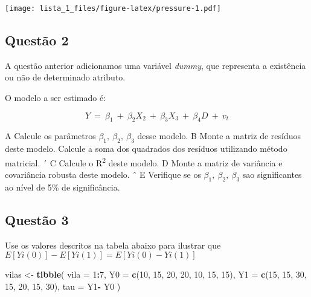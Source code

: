 \documentclass[
]{article}
\newenvironment{Shaded}{\begin{snugshade}}{\end{snugshade}}
\newcommand{\DataTypeTok}[1]{\textcolor[rgb]{0.13,0.29,0.53}{#1}}
\newcommand{\DecValTok}[1]{\textcolor[rgb]{0.00,0.00,0.81}{#1}}
\newcommand{\KeywordTok}[1]{\textcolor[rgb]{0.13,0.29,0.53}{\textbf{#1}}}
\newcommand{\NormalTok}[1]{#1}
\newcommand{\OperatorTok}[1]{\textcolor[rgb]{0.81,0.36,0.00}{\textbf{#1}}}
\newcommand{\StringTok}[1]{\textcolor[rgb]{0.31,0.60,0.02}{#1}}
\begin{document}
\texttt{[image: lista\_1\_files/figure-latex/pressure-1.pdf]}

\hypertarget{questuxe3o-2}{%
\subsection{Questão 2}\label{questuxe3o-2}}

A questão anterior adicionamos uma variável \emph{dummy}, que representa
a existência ou não de determinado atributo.

\begin{Shaded}
\end{Shaded}

O modelo a ser estimado é:

\[Y\ =\ \beta_1\ +\ \beta_2X_2\ +\ \beta_3X_3\ +\ \beta_4D\ +\ v_t\]

A Calcule os parâmetros \(\beta_{1},\ \beta_{2},\ \beta_{3}\) desse
modelo. B Monte a matriz de resíduos deste modelo. Calcule a soma dos
quadrados dos resíduos utilizando método matricial. ´ C Calcule o
R\textsuperscript{2} deste modelo. D Monte a matriz de variância e
covariância robusta deste modelo. ˆ E Verifique se os
\(\beta_{1},\ \beta_{2},\ \beta_{3}\) sao significantes ao nível de 5\%
de significância.

\hypertarget{questuxe3o-3}{%
\subsection{Questão 3}\label{questuxe3o-3}}

Use os valores descritos na tabela abaixo para ilustrar que
\(E[Yi(0)] − E[Yi(1)] =E[Yi(0) − Yi(1)]\)

\begin{Shaded}
\begin{Highlighting}[]
\NormalTok{vilas <-}\StringTok{ }\KeywordTok{tibble}\NormalTok{(}
  \DataTypeTok{vila =} \DecValTok{1}\OperatorTok{:}\DecValTok{7}\NormalTok{,}
  \DataTypeTok{Y0 =} \KeywordTok{c}\NormalTok{(}\DecValTok{10}\NormalTok{, }\DecValTok{15}\NormalTok{, }\DecValTok{20}\NormalTok{, }\DecValTok{20}\NormalTok{, }\DecValTok{10}\NormalTok{, }\DecValTok{15}\NormalTok{, }\DecValTok{15}\NormalTok{),}
  \DataTypeTok{Y1 =} \KeywordTok{c}\NormalTok{(}\DecValTok{15}\NormalTok{, }\DecValTok{15}\NormalTok{, }\DecValTok{30}\NormalTok{, }\DecValTok{15}\NormalTok{, }\DecValTok{20}\NormalTok{, }\DecValTok{15}\NormalTok{, }\DecValTok{30}\NormalTok{),}
  \DataTypeTok{tau =}\NormalTok{ Y1}\OperatorTok{-}\StringTok{ }\NormalTok{Y0}
\NormalTok{)}
\end{Highlighting}
\end{Shaded}
\end{document}
